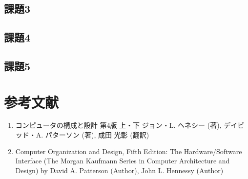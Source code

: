 \documentclass[a4j]{jarticle}
\begin{document}


\subsection{課題3}



\subsection{課題4}



\subsection{課題5}




%
%

\section{参考文献}

\begin{enumerate}
\item コンピュータの構成と設計 第4版 上・下 ジョン・L. ヘネシー (著), デイビッド・A. パターソン (著), 成田 光彰 (翻訳)
\item Computer Organization and Design, Fifth Edition: The Hardware/Software Interface (The Morgan Kaufmann Series in Computer Architecture and Design) by David A. Patterson (Author), John L. Hennessy  (Author)
\end{enumerate}
\end{document}
